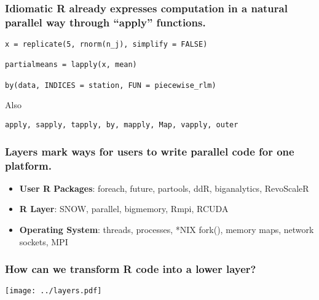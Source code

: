\documentclass{beamer}
\begin{document}
\begin{frame}[fragile]

    \frametitle{Idiomatic R already expresses computation in a natural
    parallel way through ``apply'' functions.}

\begin{verbatim}
x = replicate(5, rnorm(n_j), simplify = FALSE)

partialmeans = lapply(x, mean)

by(data, INDICES = station, FUN = piecewise_rlm)
\end{verbatim}

Also
\begin{verbatim}
apply, sapply, tapply, by, mapply, Map, vapply, outer
\end{verbatim}

\end{frame}
\begin{frame}

    \frametitle{Layers mark ways for users to write parallel code for one
    platform.}

\begin{itemize}
    \item \textbf{User R Packages}: foreach, future, partools, ddR, biganalytics, RevoScaleR
    \item \textbf{R Layer}: SNOW, parallel, bigmemory, Rmpi, RCUDA
    \item \textbf{Operating System}: threads, processes, *NIX fork(), memory maps, network sockets, MPI
\end{itemize}

\end{frame}
\begin{frame}

    \frametitle{How can we transform R code into a lower layer?}


\centerline{\texttt{[image: ../layers.pdf]}}

%
%
%
%
%

\end{frame}
\end{document}

